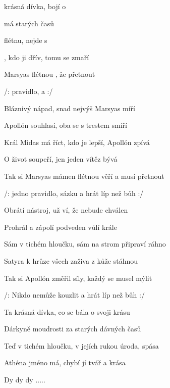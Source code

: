 

\zs
{} krásná dívka,  bojí o  

  má  starých  časů

 flétnu,  nejde s  

, kdo ji  dřív, {tomu} se  zmaří
\ks

\zr
{} Marsyas  flétnou , že  přetnout

/:  pravidlo,  a     :/
\kr

\zs
Bláznivý nápad, snad nejvýš Marsyas míří

Apollón souhlasí, oba se s trestem smíří

Král Midas má říct, kdo je lepší, Apollón zpívá

O život soupeří, jen jeden vítěz bývá
\ks

\zr
Tak si Marsyas mámen flétnou věří a musí přetnout

/: jedno pravidlo, sázku a hrát líp než bůh :/
\kr

\zs
Obrátí nástroj, už ví, že nebude chválen

Prohrál a zápolí podveden vůlí krále

Sám v tichém hloučku, sám na strom připraví ráhno

Satyra k hrůze všech zaživa z kůže stáhnou
\ks

\zr
Tak si Apollón změřil síly, každý se musel mýlit

/: Nikdo nemůže kouzlit a hrát líp než bůh :/
\kr

\zs
Ta krásná dívka, co se bála o svoji krásu

Dárkyně moudrosti za starých dávných časů

Teď v tichém hloučku, v jejích rukou úroda, spása

Athéna jméno má, chybí jí tvář a krása
\ks

\zr
Dy dy dy .....
\kr

\kp























